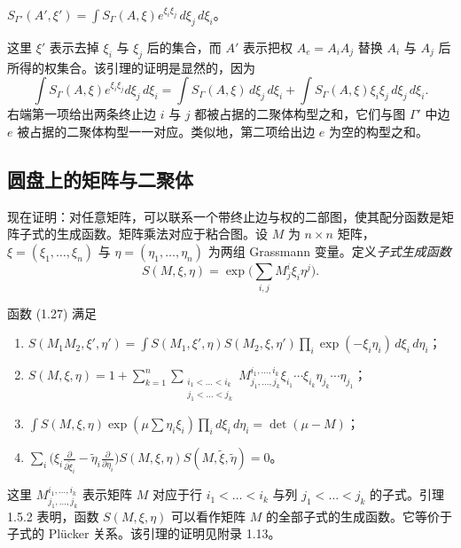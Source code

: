 \begin{lemma}\label{lem:1.5.1}
$S_{\Gamma'}(A',\xi')=\int S_\Gamma(A,\xi)e^{\xi_i\xi_j}\,d\xi_j\,d\xi_i$。
\end{lemma}

这里 $\xi'$ 表示去掉 $\xi_i$ 与 $\xi_j$ 后的集合，而 $A'$ 表示把权 $A_e=A_iA_j$ 替换 $A_i$ 与 $A_j$ 后所得的权集合。该引理的证明是显然的，因为
\[
\int S_\Gamma(A,\xi)e^{\xi_i\xi_j}d\xi_j\,d\xi_i=\int S_\Gamma(A,\xi)\,d\xi_j\,d\xi_i+\int S_\Gamma(A,\xi)\xi_i\xi_j\,d\xi_j\,d\xi_i.
\]
右端第一项给出两条终止边 $i$ 与 $j$ 都被占据的二聚体构型之和，它们与图 $\Gamma'$ 中边 $e$ 被占据的二聚体构型一一对应。类似地，第二项给出边 $e$ 为空的构型之和。

\subsection{圆盘上的矩阵与二聚体}

现在证明：对任意矩阵，可以联系一个带终止边与权的二部图，使其配分函数是矩阵子式的生成函数。矩阵乘法对应于粘合图。设 $M$ 为 $n\times n$ 矩阵，$\xi=(\xi_1,\dots,\xi_n)$ 与 $\eta=(\eta_1,\dots,\eta_n)$ 为两组 Grassmann 变量。定义\emph{子式生成函数}
\begin{equation}\label{eq:1.27}
S(M,\xi,\eta)=\exp\Big(\sum_{i,j}M^i_j\xi_i\eta^j\Big).
\tag{1.27}
\end{equation}

\begin{lemma}\label{lem:1.5.2}
函数 (1.27) 满足
\begin{enumerate}[label=(\roman*), leftmargin=2.2em, itemsep=0.15em]
\item $S(M_1M_2,\xi',\eta')=\int S(M_1,\xi',\eta)S(M_2,\xi,\eta')\prod_i\exp(-\xi_i\eta_i)\,d\xi_i\,d\eta_i$；
\item $S(M,\xi,\eta)=1+\sum_{k=1}^n\sum_{\substack{i_1<\dots<i_k\\ j_1<\dots<j_k}}M^{i_1,\dots,i_k}_{j_1,\dots,j_k}\xi_{i_1}\cdots\xi_{i_k}\eta_{j_k}\cdots\eta_{j_1}$；
\item $\int S(M,\xi,\eta)\exp(\mu\sum\eta_i\xi_i)\prod_i d\xi_i\,d\eta_i=\det(\mu-M)$；
\item $\sum_i\Big(\xi_i\frac{\partial}{\partial\tilde\xi_i}-\tilde\eta_i\frac{\partial}{\partial\eta_i}\Big)S(M,\xi,\eta)S(M,\tilde\xi,\tilde\eta)=0$。
\end{enumerate}
\end{lemma}

这里 $M^{i_1,\dots,i_k}_{j_1,\dots,j_k}$ 表示矩阵 $M$ 对应于行 $i_1<\dots<i_k$ 与列 $j_1<\dots<j_k$ 的子式。引理 1.5.2 表明，函数 $S(M,\xi,\eta)$ 可以看作矩阵 $M$ 的全部子式的生成函数。它等价于子式的 Plücker 关系。该引理的证明见附录 1.13。

